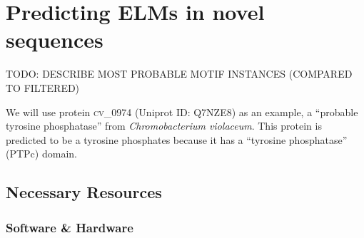 \documentclass[12pt]{article}
\newcommand\uniprot[1]{%
	\textsc{\lowercase{#1}}%
}
\begin{document}
\clearpage

\section{Predicting ELMs in novel sequences}
\label{sec:predicting_cv_0974}

TODO: DESCRIBE MOST PROBABLE MOTIF INSTANCES (COMPARED TO FILTERED)

We will use protein \uniprot{CV\_0974} (Uniprot ID: Q7NZE8) as an example, a
``probable tyrosine phosphatase'' from \textit{Chromobacterium violaceum}.
This protein is predicted to be a tyrosine phosphates because it has a
``tyrosine phosphatase'' (PTPc) domain.

%
%
\subsection*{Necessary Resources}
\subsubsection*{Software \& Hardware}

\end{document}
